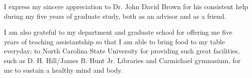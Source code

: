 \begin{acknowledgements}
I express my sincere appreciation to  Dr. John David Brown for his consistent help during my five years of graduate study, both as an advisor and as a friend. 

I am also grateful to my department and graduate school for offering me five years of teaching assistantship so that I am able to bring food to my table everyday; to North Carolina State University for providing such great facilities, such as D. H. Hill/James B. Hunt Jr. Libraries and Carmichael gymnasium, for me to sustain a healthy mind and body. 
\end{acknowledgements}


\thesistableofcontents


